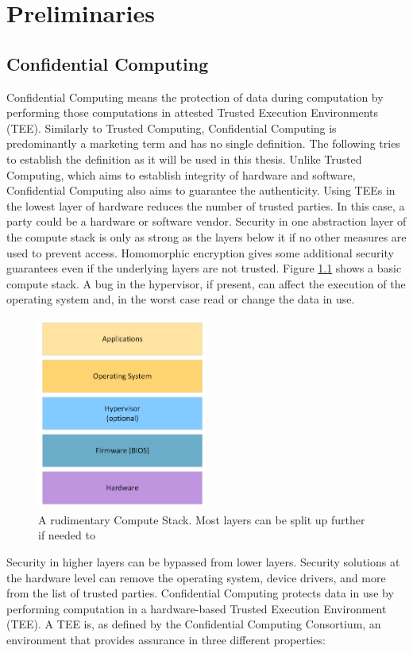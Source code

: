 \chapter{Preliminaries}
\label{ch:Foundations}

\section{Confidential Computing}
\label{sec:Foundations:ConfComputing}
Confidential Computing means the protection of data during computation by performing those computations in attested Trusted Execution Environments (TEE). Similarly to Trusted Computing, Confidential Computing is predominantly a marketing term and has no single definition. The following tries to establish the definition as it will be used in this thesis. Unlike Trusted Computing, which aims to establish integrity of hardware and software, Confidential Computing also aims to guarantee the authenticity. Using TEEs in the lowest layer of hardware reduces the number of trusted parties. In this case, a party could be a hardware or software vendor. Security in one abstraction layer of the compute stack is only as strong as the layers below it if no other measures are used to prevent access. Homomorphic encryption gives some additional security guarantees even if the underlying layers are not trusted. Figure \ref{fig:computestack} shows a basic compute stack. A bug in the hypervisor, if present, can affect the execution of the operating system and, in the worst case read or change the data in use.
\begin{figure}
\centering
\includegraphics[width=0.5\textwidth]{figures/ComputeStack.png}
\caption{A rudimentary Compute Stack. Most layers can be split up further if needed to}
\label{fig:computestack}
\end{figure}Security in higher layers can be bypassed from lower layers. Security solutions at the hardware level can remove the operating system, device drivers, and more from the list of trusted parties. Confidential Computing protects data in use by performing computation in a hardware-based Trusted Execution Environment (TEE). A TEE is, as defined by the Confidential Computing Consortium, an environment that provides assurance in three different properties:
